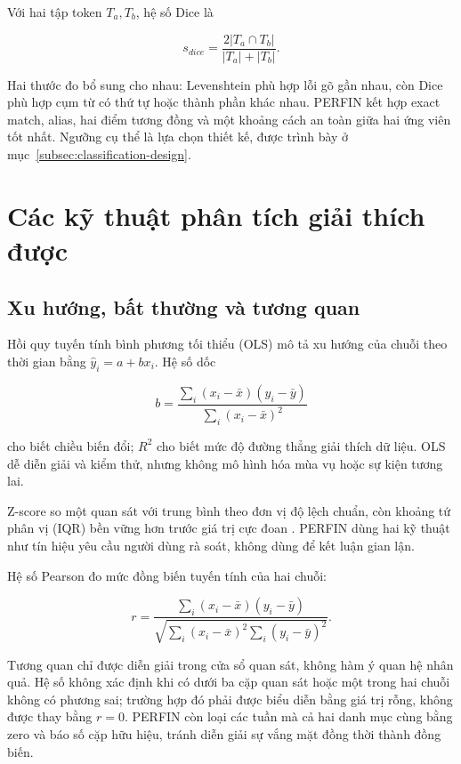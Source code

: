 Với hai tập token $T_a,T_b$, hệ số Dice \cite{dice1945} là

\begin{equation}
  s_{dice}=\frac{2|T_a\cap T_b|}{|T_a|+|T_b|}.
\end{equation}

Hai thước đo bổ sung cho nhau: Levenshtein phù hợp lỗi gõ gần nhau, còn Dice phù hợp cụm từ có thứ tự hoặc thành phần khác nhau. PERFIN kết hợp exact match, alias, hai điểm tương đồng và một khoảng cách an toàn giữa hai ứng viên tốt nhất. Ngưỡng cụ thể là lựa chọn thiết kế, được trình bày ở mục~\ref{subsec:classification-design}.

\section{Các kỹ thuật phân tích giải thích được}
\label{sec:algorithms}

\subsection{Xu hướng, bất thường và tương quan}

Hồi quy tuyến tính bình phương tối thiểu (OLS) \cite{montgomery2012} mô tả xu hướng của chuỗi theo thời gian bằng $\hat y_i=a+bx_i$. Hệ số dốc

\begin{equation}
  b=\frac{\sum_i(x_i-\bar{x})(y_i-\bar{y})}
          {\sum_i(x_i-\bar{x})^2}
\end{equation}

cho biết chiều biến đổi; $R^2$ cho biết mức độ đường thẳng giải thích dữ liệu. OLS dễ diễn giải và kiểm thử, nhưng không mô hình hóa mùa vụ hoặc sự kiện tương lai.

Z-score so một quan sát với trung bình theo đơn vị độ lệch chuẩn, còn khoảng tứ phân vị (IQR) bền vững hơn trước giá trị cực đoan \cite{tukey1977}. PERFIN dùng hai kỹ thuật như tín hiệu yêu cầu người dùng rà soát, không dùng để kết luận gian lận.

Hệ số Pearson \cite{pearson1895} đo mức đồng biến tuyến tính của hai chuỗi:

\begin{equation}
  r=\frac{\sum_i(x_i-\bar{x})(y_i-\bar{y})}
  {\sqrt{\sum_i(x_i-\bar{x})^2\sum_i(y_i-\bar{y})^2}}.
\end{equation}

Tương quan chỉ được diễn giải trong cửa sổ quan sát, không hàm ý quan hệ nhân quả.
Hệ số không xác định khi có dưới ba cặp quan sát hoặc một trong hai chuỗi không có
phương sai; trường hợp đó phải được biểu diễn bằng giá trị rỗng, không được thay
bằng $r=0$. PERFIN còn loại các tuần mà cả hai danh mục cùng bằng zero và báo số
cặp hữu hiệu, tránh diễn giải sự vắng mặt đồng thời thành đồng biến.

